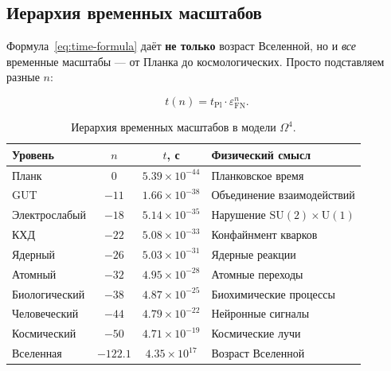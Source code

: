 \documentclass[11pt,a4paper]{article}
\newcommand{\SU}{\mathrm{SU}}
\newcommand{\Om}{\Omega^4}
\newcommand{\epsFN}{\varepsilon_{\text{FN}}}
\theoremstyle{definition}
\begin{document}
\subsection{Иерархия временных масштабов}
\label{subsec:time-hierarchy}

Формула~\eqref{eq:time-formula} даёт \textbf{не только} возраст 
Вселенной, но и \emph{все} временные масштабы — от Планка до 
космологических. Просто подставляем разные $n$:

\begin{equation}
    \boxed{
    t(n) = t_{\text{Pl}} \cdot \epsFN^n.
    }
    \label{eq:time-hierarchy}
\end{equation}

\begin{table}[htbp]
\centering
\caption{Иерархия временных масштабов в модели $\Om$.}
\label{tab:time-hierarchy}
\begin{tabular}{lccl}
\toprule
Уровень & $n$ & $t$, с & Физический смысл \\
\midrule
Планк & $0$ & $5.39 \times 10^{-44}$ & Планковское время \\
GUT & $-11$ & $1.66 \times 10^{-38}$ & Объединение взаимодействий \\
Электрослабый & $-18$ & $5.14 \times 10^{-35}$ & Нарушение $\SU(2) \times \mathrm{U}(1)$ \\
КХД & $-22$ & $5.08 \times 10^{-33}$ & Конфайнмент кварков \\
Ядерный & $-26$ & $5.03 \times 10^{-31}$ & Ядерные реакции \\
Атомный & $-32$ & $4.95 \times 10^{-28}$ & Атомные переходы \\
Биологический & $-38$ & $4.87 \times 10^{-25}$ & Биохимические процессы \\
Человеческий & $-44$ & $4.79 \times 10^{-22}$ & Нейронные сигналы \\
Космический & $-50$ & $4.71 \times 10^{-19}$ & Космические лучи \\
Вселенная & $-122.1$ & $4.35 \times 10^{17}$ & Возраст Вселенной \\
\bottomrule
\end{tabular}
\end{table}
\end{document}
